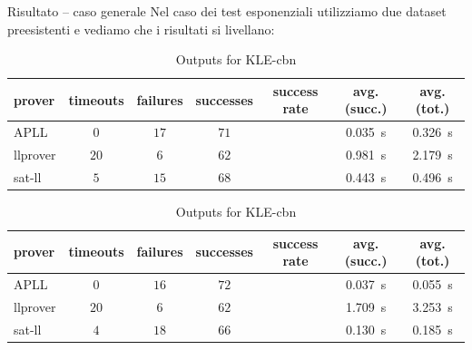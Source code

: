 \documentclass{beamer}
\begin{document}
\begin{frame}{Risultato -- caso generale}
	Nel caso dei test esponenziali utilizziamo due dataset preesistenti e vediamo che i risultati si livellano:
	\begin{table}[h!]
		\begin{subtable}{\textwidth}
			\centering
			{\footnotesize
			\begin{tabular}{ | l c c c c c c | }
				\hline
				\textbf{prover} & \textbf{timeouts} & \textbf{failures} & \textbf{successes} & \textbf{success rate} & \textbf{avg. (succ.)} & \textbf{avg. (tot.)} \\
				\hline
				\hline
				APLL     & $0$  & $17$ & $71$ & \color{darkbluestatale}{$\approx 0.80$} & \qty{0.035}{\second} & \qty{0.326}{\second} \\
				llprover & $20$ & $6$  & $62$ & \color{darkbluestatale}{$\approx 0.70$} & \qty{0.981}{\second} & \qty{2.179}{\second} \\
				sat-ll   & $5$  & $15$ & $68$ & \color{darkbluestatale}{$\approx 0.77$} & \qty{0.443}{\second} & \qty{0.496}{\second} \\
				\hline
			\end{tabular}
			}
			\caption{Outputs for KLE-cbv}
			\label{table:KLE-cbv}
		\end{subtable}
		\begin{subtable}{\textwidth}
			\centering
			{\footnotesize
			\begin{tabular}{ | l c c c c c c | }
				\hline
				\textbf{prover} & \textbf{timeouts} & \textbf{failures} & \textbf{successes} & \textbf{success rate} & \textbf{avg. (succ.)} & \textbf{avg. (tot.)} \\
				\hline
				\hline
				APLL     & $0$  & $16$ & $72$ & \color{darkbluestatale}{$\approx 0.80$} & \qty{0.037}{\second} & \qty{0.055}{\second} \\
				llprover & $20$ & $6$  & $62$ & \color{darkbluestatale}{$\approx 0.70$} & \qty{1.709}{\second} & \qty{3.253}{\second} \\
				sat-ll   & $4$  & $18$ & $66$ & \color{darkbluestatale}{$\approx 0.75$} & \qty{0.130}{\second} & \qty{0.185}{\second} \\
				\hline
			\end{tabular}
			}
			\caption{Outputs for KLE-cbn}
			\label{table:KLE-cbn}
		\end{subtable}
	\end{table}
\end{frame}


\backmatter[notitle]

\end{document}
